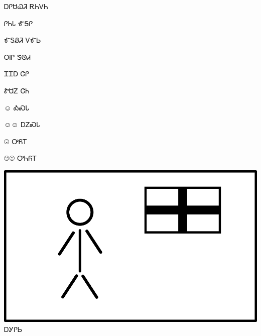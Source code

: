 \documentclass[avery5371]{flashcards}%
\begin{document}

\begin{flashcard}{\Huge ᎠᎵᏌᏇᏘ}
\textbf{\Huge} ᎡᏂᏙᏂ
\end{flashcard}

\begin{flashcard}{\Huge ᎵᏂᏓ}
\textbf{\Huge} ᎹᎦᎵ
\end{flashcard}

\begin{flashcard}{\Huge ᎹᎦᏰᏘ}
\textbf{\Huge} ᏙᎹᏏ
\end{flashcard}

\begin{flashcard}{\Huge ᎺᎵ}
\textbf{\Huge} ᏕᏫᏗ
\end{flashcard}

\begin{flashcard}{\Huge ᏆᏆᎠ}
\textbf{\Huge} ᏣᎵ
\end{flashcard}

\begin{flashcard}{\Huge ᏑᏌᏃ}
\textbf{\Huge} ᏣᏂ
\end{flashcard}


\begin{flashcard}{\normalfont\Huge\fontsize{128pt}{128pt}\selectfont ☺}
\Huge ᎣᏍᏓ
\end{flashcard}

\begin{flashcard}{\normalfont\Huge\fontsize{128pt}{128pt}\selectfont ☺☺}
\Huge ᎠᏃᏍᏓ
\end{flashcard}

\begin{flashcard}{\normalfont\Huge\fontsize{128pt}{128pt}\selectfont ☹}
\Huge ᎤᏲᎢ
\end{flashcard}

\begin{flashcard}{\normalfont\Huge\fontsize{128pt}{128pt}\selectfont ☹☹}
\Huge ᎤᏂᏲᎢ
\end{flashcard}


\begin{flashcard}{
\includegraphics[width=0.95\columnwidth,height=.51\columnwidth,keepaspectratio]{../artwork/flags/agilisi-flag}
}
\Huge ᎠᎩᎵᏏ
\end{flashcard}
\end{document}
